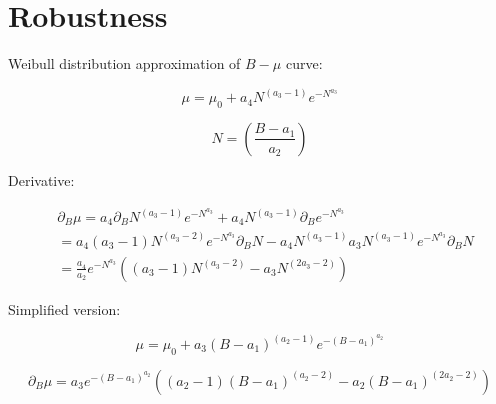 \newpage
\chapter{Robustness}

\noindent Weibull distribution approximation of $B-\mu$ curve:

\begin{equation} \label{eq:70} 
\mu = \mu_0 + a_4 N^{\left(a_3 - 1\right)} e^{-N^{a_3}}
\end{equation}

\begin{equation} \label{eq:71} 
N = \left( \frac{B - a_1}{a_2} \right)
\end{equation}

\noindent Derivative:

\begin{align*}
&\partial_B \mu = a_4 \partial_B N^{\left(a_3 - 1\right)} e^{-N^{a_3}} + a_4 N^{\left(a_3 - 1\right)} \partial_B e^{-N^{a_3}}\\
&= a_4 \left(a_3 - 1\right) N^{\left(a_3 - 2\right)}  e^{-N^{a_3}} \partial_B N - a_4 N^{\left(a_3 - 1\right)} a_3 N^{\left(a_3 - 1\right)} e^{-N^{a_3}} \partial_B N \\
&= \frac{a_4}{a_2} e^{-N^{a_3}} \left(\left(a_3 -1\right) N^{\left(a_3 - 2\right)} - a_3 N^{\left(2a_3 - 2\right)} \right) 
\end{align*}

\noindent Simplified version:

\begin{equation} \label{eq:70} 
\mu = \mu_0 + a_3 \left( B - a_1 \right)^{\left(a_2 - 1\right)} e^{-\left( B - a_1 \right)^{a_2}}
\end{equation}

\begin{equation} \label{eq:71} 
\partial_B \mu = a_3 e^{-\left( B - a_1 \right)^{a_2}} \left(\left(a_2 -1\right) \left( B - a_1 \right)^{\left(a_2 - 2\right)} - a_2 \left( B - a_1 \right)^{\left(2a_2 - 2\right)} \right) 
\end{equation}





